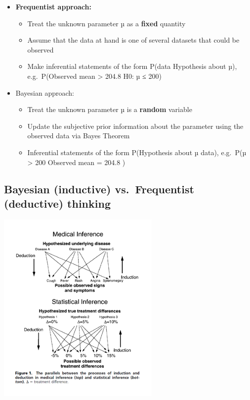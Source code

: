 \documentclass[
]{book}
\providecommand{\tightlist}{%
  \setlength{\itemsep}{0pt}\setlength{\parskip}{0pt}}
\begin{document}
\begin{itemize}
\tightlist
\item
  \textbf{Frequentist approach:}

  \begin{itemize}
  \tightlist
  \item
    Treat the unknown parameter µ as a \textbf{fixed} quantity
  \item
    Assume that the data at hand is one of several datasets that could be observed
  \item
    Make inferential statements of the form P(data \textbar{} Hypothesis about µ), e.g.~P(Observed mean \textgreater{} 204.8 \textbar{} H0: µ ≤ 200)
  \end{itemize}
\item
  Bayesian approach:

  \begin{itemize}
  \tightlist
  \item
    Treat the unknown parameter µ is a \textbf{random} variable
  \item
    Update the subjective prior information about the parameter using the observed data via Bayes Theorem
  \item
    Inferential statements of the form P(Hypothesis about µ \textbar{} data),
    e.g.~P(µ \textgreater{} 200 \textbar{} Observed mean = 204.8 )
  \end{itemize}
\end{itemize}

\hypertarget{bayesian-inductive-vs.-frequentist-deductive-thinking}{%
\subsection{Bayesian (inductive) vs.~Frequentist (deductive) thinking}\label{bayesian-inductive-vs.-frequentist-deductive-thinking}}

\includegraphics[width=0.5\linewidth]{./6_10}
\end{document}

